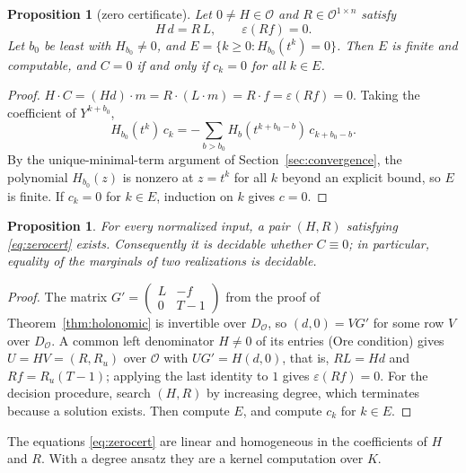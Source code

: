 \documentclass[11pt,a4paper]{article}
\newcommand{\Op}{\mathcal O}
\newcommand{\Dop}{D_{\Op}}
\newcommand{\eps}{\varepsilon}
\theoremstyle{plain}
\newtheorem{proposition}[theorem]{Proposition}
\theoremstyle{definition}
\theoremstyle{remark}
\begin{document}
\begin{proposition}[zero certificate]\label{prop:zero}
Let $0\ne H\in\Op$ and $R\in\Op^{1\times n}$ satisfy
\begin{equation}\label{eq:zerocert}
  H\,d=R\,L,\qquad \eps(Rf)=0.
\end{equation}
Let $b_0$ be least with $H_{b_0}\ne0$, and
$E=\{k\ge0:H_{b_0}(t^k)=0\}$. Then $E$ is finite and computable, and
$C=0$ if and only if $c_k=0$ for all $k\in E$.
\end{proposition}
\begin{proof}
$H\cdot C=(Hd)\cdot m=R\cdot(L\cdot m)=R\cdot f=\eps(Rf)=0$. Taking the
coefficient of $Y^{k+b_0}$,
\[
  H_{b_0}(t^k)\,c_k=-\sum_{b>b_0}H_b(t^{k+b_0-b})\,c_{k+b_0-b}.
\]
By the unique-minimal-term argument of Section~\ref{sec:convergence}, the
polynomial $H_{b_0}(z)$ is nonzero at $z=t^k$ for all $k$ beyond an explicit
bound, so $E$ is finite. If $c_k=0$ for $k\in E$, induction on $k$ gives $c=0$.
\end{proof}

\begin{proposition}\label{prop:zero-exists}
For every normalized input, a pair $(H,R)$ satisfying \eqref{eq:zerocert}
exists. Consequently it is decidable whether $C\equiv0$; in particular,
equality of the marginals of two realizations is decidable.
\end{proposition}
\begin{proof}
The matrix $G'=\left(\begin{smallmatrix}L&-f\\0&T-1\end{smallmatrix}\right)$ from
the proof of Theorem~\ref{thm:holonomic} is invertible over $\Dop$, so
$(d,0)=VG'$ for some row $V$ over $\Dop$. A common left denominator $H\ne0$ of
its entries (Ore condition) gives $U=HV=(R,R_u)$ over $\Op$ with $UG'=H(d,0)$,
that is, $RL=Hd$ and $Rf=R_u(T-1)$; applying the last identity to $1$ gives
$\eps(Rf)=0$. For the decision procedure, search $(H,R)$ by increasing degree,
which terminates because a solution exists. Then compute $E$, and compute
$c_k$ for $k\in E$.
\end{proof}

The equations \eqref{eq:zerocert} are linear and homogeneous in the
coefficients of $H$ and $R$. With a degree ansatz they are a kernel computation
over $K$.
\end{document}
